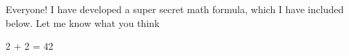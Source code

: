 Everyone! I have developed a super secret math formula, which I have included below. Let me know what you think


2 + 2 = 42
